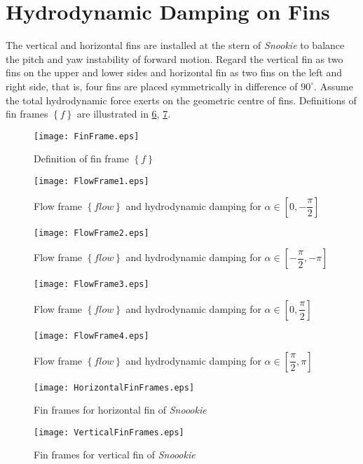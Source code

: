 \section{Hydrodynamic Damping on Fins}
The vertical and horizontal fins are installed at the stern of \textit{Snookie} to balance the pitch and yaw instability of forward motion. Regard the vertical fin as two fins on the upper and lower sides and horizontal fin as two fins on the left and right side, that is, four fins are placed symmetrically in difference of $90^{\circ}$. Assume the total hydrodynamic force exerts on the geometric centre of fins. Definitions of fin frames $\left\{ f \right\}$ are illustrated in \ref{FIG:FlowFrameSnookieVerti}, \ref{FIG:FlowFrameSnookieHori}.
\begin{figure}
\centering
\texttt{[image: FinFrame.eps]}
\caption{Definition of fin frame $\left\{ f \right\}$}	
\label{FIG:FinFrame}
\end{figure}
\begin{figure}
\centering
\texttt{[image: FlowFrame1.eps]}
\caption{Flow frame $\left\{ flow \right\}$ and hydrodynamic damping for $\alpha\in[0,-\dfrac{\pi}{2}]$}	
\label{FIG:FlowFrame1}
\end{figure}
\begin{figure}
\centering
\texttt{[image: FlowFrame2.eps]}
\caption{Flow frame $\left\{ flow \right\}$ and hydrodynamic damping for $\alpha\in[-\dfrac{\pi}{2},-\pi]$}	
\label{FIG:FlowFrame2}
\end{figure}
\begin{figure}
\centering
\texttt{[image: FlowFrame3.eps]}
\caption{Flow frame $\left\{ flow \right\}$ and hydrodynamic damping for $\alpha\in[0,\dfrac{\pi}{2}]$}	
\label{FIG:FlowFrame3}
\end{figure}
\begin{figure}
\centering
\texttt{[image: FlowFrame4.eps]}
\caption{Flow frame $\left\{ flow \right\}$ and hydrodynamic damping for $\alpha\in[\dfrac{\pi}{2},\pi]$}	
\label{FIG:FlowFrame4}
\end{figure}
\begin{figure}
\centering
\texttt{[image: HorizontalFinFrames.eps]}
\caption{Fin frames for horizontal fin of \textit{Snoookie}}	
\label{FIG:FlowFrameSnookieVerti}
\end{figure}
\begin{figure}
\centering
\texttt{[image: VerticalFinFrames.eps]}
\caption{Fin frames for vertical fin of \textit{Snoookie}}	
\label{FIG:FlowFrameSnookieHori}
\end{figure}

